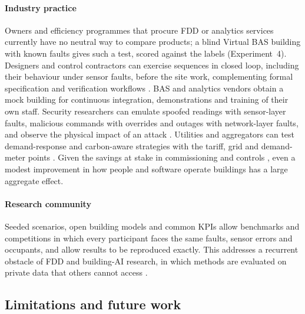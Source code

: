 \documentclass[preprint,12pt,authoryear=false]{elsarticle}
\begin{document}
\paragraph{Industry practice} Owners and efficiency programmes that procure FDD or analytics services currently have no
neutral way to compare products; a blind Virtual BAS building with known faults gives such a test, scored against the
labels (Experiment~4). Designers and control contractors can exercise sequences in closed loop, including their
behaviour under sensor faults, before the site work, complementing formal specification and verification workflows
\cite{wetter2022obc}. BAS and analytics vendors obtain a mock building for continuous integration, demonstrations and
training of their own staff. Security researchers can emulate spoofed readings with sensor-layer faults, malicious
commands with overrides and outages with network-layer faults, and observe the physical impact of an attack
\cite{granzer2010security}. Utilities and aggregators can test demand-response and carbon-aware strategies with the
tariff, grid and demand-meter points \cite{neukomm2019geb}. Given the savings at stake in commissioning
\cite{mills2011commissioning} and controls \cite{fernandez2017controls}, even a modest improvement in how people and
software operate buildings has a large aggregate effect.

\paragraph{Research community} Seeded scenarios, open building models and common KPIs allow benchmarks and competitions
in which every participant faces the same faults, sensor errors and occupants, and allow results to be reproduced
exactly. This addresses a recurrent obstacle of FDD and building-AI research, in which methods are evaluated on
private data that others cannot access \cite{katipamula2005review1,kim2018fddreview}.

\subsection{Limitations and future work}
\label{sec:limitations}
\end{document}

